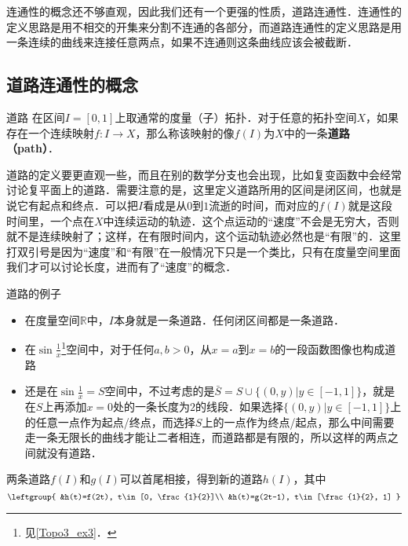 
连通性的概念还不够直观，因此我们还有一个更强的性质，道路连通性．连通性的定义思路是用不相交的开集来分割不连通的各部分，而道路连通性的定义思路是用一条连续的曲线来连接任意两点，如果不连通则这条曲线应该会被截断．

\subsection{道路连通性的概念}
\begin{definition}{道路}\label{Topo4_def1}
在区间$I=[0,1]$上取通常的度量（子）拓扑．对于任意的拓扑空间$X$，如果存在一个连续映射$f: I\rightarrow X$，那么称该映射的像$f(I)$为$X$中的一条\textbf{道路（path）}．
\end{definition}

道路的定义要更直观一些，而且在别的数学分支也会出现，比如复变函数中会经常讨论复平面上的道路．需要注意的是，这里定义道路所用的区间是闭区间，也就是说它有起点和终点．可以把$I$看成是从$0$到$1$流逝的时间，而对应的$f(I)$就是这段时间里，一个点在$X$中连续运动的轨迹．这个点运动的“速度”不会是无穷大，否则就不是连续映射了；这样，在有限时间内，这个运动轨迹必然也是“有限”的．这里打双引号是因为“速度”和“有限”在一般情况下只是一个类比，只有在度量空间里面我们才可以讨论长度，进而有了“速度”的概念．

\begin{example}{道路的例子}\label{Topo4_ex1}
\begin{itemize}
\item 在度量空间$\mathbb{R}$中，$I$本身就是一条道路．任何闭区间都是一条道路．
\item 在$\sin{\frac{1}{x}}$\footnote{见\autoref{Topo3_ex3}．}空间中，对于任何$a, b>0$，从$x=a$到$x=b$的一段函数图像也构成道路
\item 还是在$\sin{\frac{1}{x}}=S$空间中，不过考虑的是$\bar{S}=S\cup\{(0, y)|y\in [-1,1]\}$，就是在$S$上再添加$x=0$处的一条长度为$2$的线段．如果选择$\{(0, y)|y\in [-1,1]\}$上的任意一点作为起点/终点，而选择$S$上的一点作为终点/起点，那么中间需要走一条无限长的曲线才能让二者相连，而道路都是有限的，所以这样的两点之间就没有道路．

\end{itemize}
\end{example}

两条道路$f(I)$和$g(I)$可以首尾相接，得到新的道路$h(I)$，其中
\begin{equation}
\leftgroup{
&h(t)=f(2t), t\in[0, \frac{1}{2}]\\
&h(t)=g(2t-1), t\in[\frac{1}{2}, 1]
}
\end{equation}


